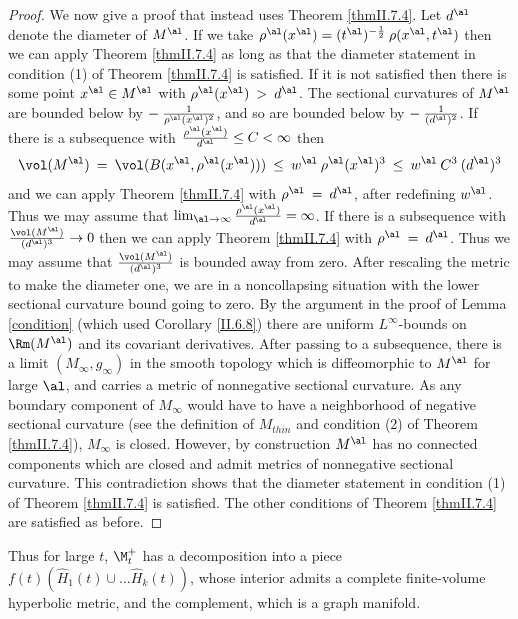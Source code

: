 \begin{proof}
We now give a proof that instead uses Theorem \ref{thmII.7.4}.
Let $d^\al$ denote the diameter of $M^\al$.
If we take $\rho^\al(x^\al) = (t^\al)^{- \frac12} \: \rho(x^\al, t^\al)$
then we can apply Theorem \ref{thmII.7.4} as long as
that the diameter statement in condition (1) of Theorem \ref{thmII.7.4} is
satisfied.
If it is not satisfied then there is some point $x^\al \in M^\al$ with
$\rho^\al(x^\al) \: > \:  d^\al$.
The sectional curvatures of $M^\al$ are bounded below by
$- \: \frac{1}{\rho^\al(x^\al)^2}$, and so are bounded below by
$- \: \frac{1}{(d^\al)^2}$.
If there is a subsequence  with
$\frac{\rho^\al(x^\al)}{d^\al} \le C < \infty$  then
\begin{equation}
\vol(M^\al) \: = \: \vol(B(x^\al, \rho^\al(x^\al))) \: \le \: w^\al \:
\rho^\al(x^\al)^3 \: \le \: w^\al \: C^3 \: (d^\al)^3
\end{equation}
and we can apply Theorem \ref{thmII.7.4} with $\rho^\al \: = \: d^\al$,
after redefining $w^\al$.
Thus we may assume that
$\lim_{\al \rightarrow \infty} \frac{\rho^\al(x^\al)}{d^\al} = \infty$.
If there is a subsequence with
$\frac{\vol(M^\al)}{(d^\al)^3}  \rightarrow 0$ then we
can apply Theorem \ref{thmII.7.4} with $\rho^\al \: = \: d^\al$.
Thus we may assume that $\frac{\vol(M^\al)}{(d^\al)^3}$ is bounded away from zero.
After rescaling the metric to make the diameter one, we are in a
noncollapsing situation
with the lower sectional curvature bound going to zero.
By the argument in the proof of Lemma \ref{condition} (which used
Corollary \ref{II.6.8}) there are uniform $L^\infty$-bounds on $\Rm(M^\al)$ and
its covariant derivatives.  After passing to a subsequence, there is a
limit $(M_\infty, g_\infty)$ in the smooth topology which is diffeomorphic
to $M^\al$ for large $\al$, and carries a metric of nonnegative sectional curvature.
As any boundary component of $M_\infty$ would have to have a neighborhood
of negative sectional curvature (see
the definition of $M_{thin}$ and
condition (2) of Theorem \ref{thmII.7.4}),
$M_\infty$ is closed. However, by construction $M^\al$ has no connected components
which are closed and admit metrics of nonnegative sectional curvature.
 This contradiction shows that the diameter statement in condition
(1) of Theorem \ref{thmII.7.4} is satisfied. The other conditions of
Theorem \ref{thmII.7.4} are satisfied as before.
\end{proof}

Thus for large $t$,  $\M_t^+$ has a decomposition into
a piece  $f(t) (\widehat{H}_1(t) \cup \ldots \widehat{H}_k(t))$, whose interior admits
a complete finite-volume hyperbolic metric, and the complement, which is a
graph manifold.


